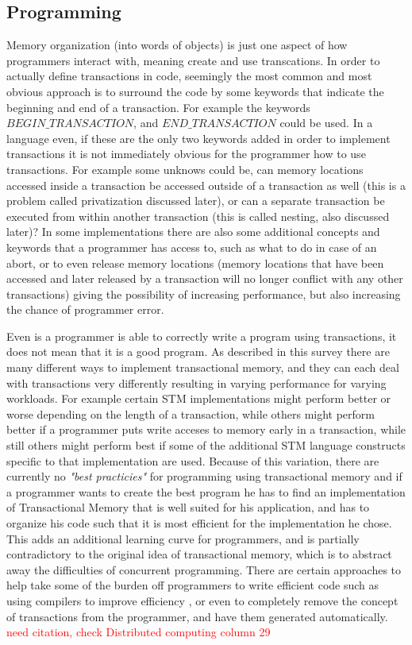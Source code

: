 \subsection{Programming}
Memory organization (into words of objects) is just one aspect of how programmers interact with, meaning create and use transcations.
In order to actually define transactions in code, seemingly the most common and most obvious approach is to surround the code by some keywords that indicate the beginning and end of a transaction.
For example the keywords $BEGIN\_TRANSACTION$, and $END\_TRANSACTION$ could be used.
In a language even, if these are the only two keywords added in order to implement transactions it is not immediately obvious for the programmer how to use transactions.
For example some unknows could be, can memory locations accessed inside a transaction be accessed outside of a transaction as well (this is a problem called privatization discussed later), or can a separate transaction be executed from within another transaction (this is called nesting, also discussed later)?
In some implementations there are also some additional concepts and keywords that a programmer has access to, such as what to do in case of an abort, or to even release memory locations (memory locations that have been accessed and later released by a transaction will no longer conflict with any other transactions) giving the possibility of increasing performance, but also increasing the chance of programmer error.

Even is a programmer is able to correctly write a program using transactions, it does not mean that it is a good program.
As described in this survey there are many different ways to implement transactional memory, and they can each deal with transactions very differently resulting in varying performance for varying workloads.
For example certain STM implementations might perform better or worse depending on the length of a transaction, while others might perform better if a programmer puts write acceses to memory early in a transaction, while still others might perform best if some of the additional STM language constructs specific to that implementation are used.
Because of this variation, there are currently no \emph{"best practicies"} for programming using transactional memory and if a programmer wants to create the best program he has to find an implementation of Transactional Memory that is well suited for his application, and has to organize his code such that it is most efficient for the implementation he chose.
This adds an additional learning curve for programmers, and is partially contradictory to the original idea of transactional memory, which is to abstract away the difficulties of concurrent programming.
There are certain approaches to help take some of the burden off programmers to write efficient code such as using compilers to improve efficiency \cite{1133985}, or even to completely remove the concept of transactions from the programmer, and have them generated automatically. \textcolor{Red}{need citation, check Distributed computing column 29}

